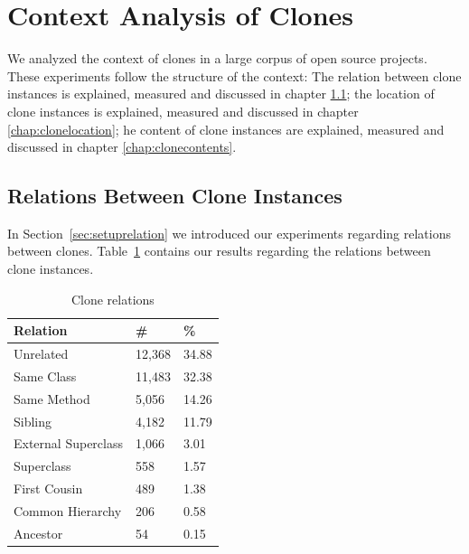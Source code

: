 \section{Context Analysis of Clones}\label{chap:clonecontextexpl}
We analyzed the context of clones in a large corpus of open source projects. These experiments follow the structure of the context: The relation between clone instances is explained, measured and discussed in chapter \ref{chap:relationsinstances}; the location of clone instances is explained, measured and discussed in chapter \ref{chap:clonelocation};  he content of clone instances are explained, measured and discussed in chapter \ref{chap:clonecontents}.

\subsection{Relations Between Clone Instances} \label{chap:relationsinstances}
In Section~\ref{sec:setuprelation} we introduced our experiments regarding relations between clones. Table~\ref{table:relations} contains our results regarding the relations between clone instances.

\begin{table}[H]
  \begin{center}
  \caption{Clone relations} \label{table:relations}
  \medskip
\begin{tabular}{|l|l|l|} \hline
\textbf{Relation} & \textbf{\#} & \textbf{\%} \\ \hline
Unrelated          & 12,368 & 34.88            \\ \hline
Same Class          & 11,483 & 32.38             \\ \hline
Same Method               & 5,056 & 14.26            \\ \hline
Sibling         & 4,182 & 11.79             \\ \hline
External Superclass   & 1,066 & 3.01             \\ \hline
Superclass          & 558 & 1.57           \\ \hline
First Cousin          & 489 & 1.38           \\ \hline
Common Hierarchy    & 206 & 0.58            \\ \hline
Ancestor          & 54 & 0.15          \\ \hline
\end{tabular}
\end{center}
\end{table}

